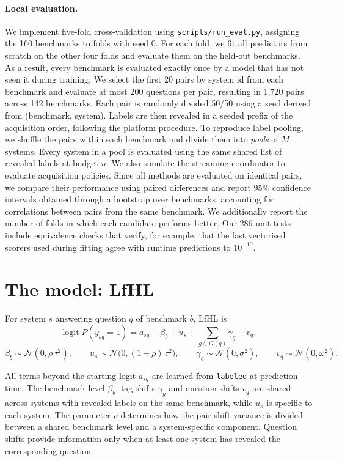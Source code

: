 \documentclass{article}
\newcommand{\lfhl}{LfHL}
\newcommand{\code}[1]{\texttt{#1}}
\newcommand{\labeled}{\code{labeled}}
\newcommand{\N}{\mathcal{N}}
\begin{document}
\paragraph{Local evaluation.} We implement five-fold cross-validation using \code{scripts/run\_eval.py}, assigning the 160 benchmarks to folds with seed 0. For each fold, we fit all predictors from scratch on the other four folds and evaluate them on the held-out benchmarks. As a result, every benchmark is evaluated exactly once by a model that has not seen it during training. We select the first 20 pairs by system id from each benchmark and evaluate at most 200 questions per pair, resulting in 1{,}720 pairs across 142 benchmarks. Each pair is randomly divided 50/50 using a seed derived from (benchmark, system). Labels are then revealed in a seeded prefix of the acquisition order, following the platform procedure. To reproduce label pooling, we shuffle the pairs within each benchmark and divide them into \emph{pools} of $M$ systems. Every system in a pool is evaluated using the same shared list of revealed labels at budget $n$. We also simulate the streaming coordinator to evaluate acquisition policies. Since all methods are evaluated on identical pairs, we compare their performance using paired differences and report 95\% confidence intervals obtained through a bootstrap over benchmarks, accounting for correlations between pairs from the same benchmark. We additionally report the number of folds in which each candidate performs better. Our 286 unit tests include equivalence checks that verify, for example, that the fast vectorised scorers used during fitting agree with runtime predictions to $10^{-10}$.


\section{The model: \lfhl}
\label{sec:model}

For system $s$ answering question $q$ of benchmark $b$, \lfhl{} is
\begin{equation}
  \operatorname{logit} P(y_{sq}=1) = a_{sq} + \beta_b + u_s + \sum_{g \in G(q)} \gamma_g + v_q,
  \label{eq:pooled}
\end{equation}
\begin{equation*}
  \beta_b \sim \N(0, \rho\,\tau^2), \qquad u_s \sim \N\big(0, (1-\rho)\,\tau^2\big), \qquad \gamma_g \sim \N(0,\sigma^2), \qquad v_q \sim \N(0,\omega^2).
\end{equation*}

All terms beyond the starting logit $a_{sq}$ are learned from \labeled{} at prediction time. The benchmark level $\beta_b$, tag shifts $\gamma_g$ and question shifts $v_q$ are shared across systems with revealed labels on the same benchmark, while $u_s$ is specific to each system. The parameter $\rho$ determines how the pair-shift variance is divided between a shared benchmark level and a system-specific component. Question shifts provide information only when at least one system has revealed the corresponding question.
\end{document}
